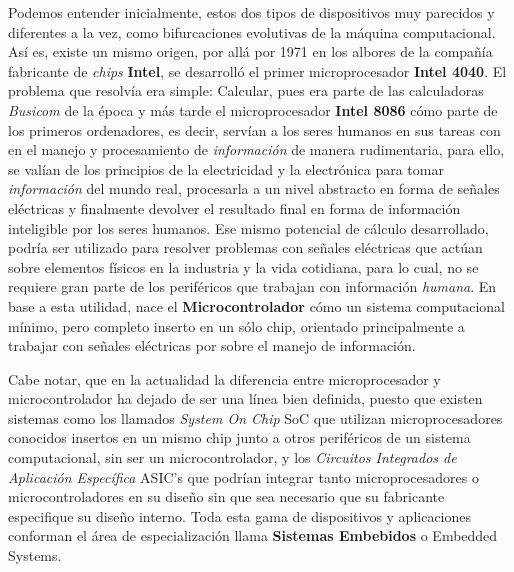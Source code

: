 \documentclass[letterpaper, 10pt]{report}
\begin{document}
	Podemos entender inicialmente, estos dos tipos de dispositivos muy parecidos y diferentes a la vez, como bifurcaciones evolutivas de la máquina computacional. Así es, existe un mismo origen, por allá por 1971 en los albores de la compañía fabricante de \emph{chips} {\bf Intel}, se desarrolló el primer microprocesador {\bf Intel 4040}. El problema que resolvía era simple: Calcular, pues era parte de las calculadoras \emph{Busicom} de la época y más tarde el microprocesador {\bf Intel 8086} cómo parte de los primeros ordenadores, es decir, servían a los seres humanos en sus tareas con en el manejo y procesamiento de \emph{información} de manera rudimentaria, para ello, se valían de los principios de la electricidad y la electrónica para tomar \emph{información} del mundo real, procesarla a un nivel abstracto en forma de señales eléctricas y finalmente devolver el resultado final en forma de información inteligible por los seres humanos. Ese mismo potencial de cálculo desarrollado, podría ser utilizado para resolver problemas con señales eléctricas que actúan sobre elementos físicos en la industria y la vida cotidiana, para lo cual, no se requiere gran parte de los periféricos que trabajan con información \emph{humana}. En base a esta utilidad, nace el {\bf Microcontrolador} cómo un sistema computacional mínimo, pero completo inserto en un sólo chip, orientado principalmente a trabajar con señales eléctricas por sobre el manejo de información. \cite{libroMicro}
	
	Cabe notar, que en la actualidad la diferencia entre microprocesador y microcontrolador ha dejado de ser una línea bien definida, puesto que existen sistemas como los llamados \emph{System On Chip} SoC que utilizan microprocesadores conocidos insertos en un mismo chip junto a otros periféricos de un sistema computacional, sin ser un microcontrolador, y los \emph{Circuitos Integrados de Aplicación Específica} ASIC's que podrían integrar tanto microprocesadores o microcontroladores en su diseño sin que sea necesario que su fabricante especifique su diseño interno. Toda esta gama de dispositivos y aplicaciones conforman el área de especialización llama \textbf{Sistemas Embebidos} o Embedded Systems. 
	
\end{document}
